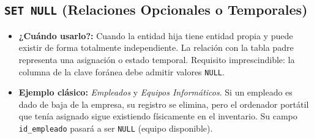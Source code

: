 \documentclass[12pt,a4paper]{article}
\begin{document}
\subsection{\texttt{SET NULL} (Relaciones Opcionales o Temporales)}
\begin{itemize}
    \item \textbf{¿Cuándo usarlo?:} Cuando la entidad hija tiene entidad propia y puede existir de forma totalmente independiente. La relación con la tabla padre representa una asignación o estado temporal. Requisito imprescindible: la columna de la clave foránea debe admitir valores \texttt{NULL}.
    \item \textbf{Ejemplo clásico:} \textit{Empleados} y \textit{Equipos Informáticos}. Si un empleado es dado de baja de la empresa, su registro se elimina, pero el ordenador portátil que tenía asignado sigue existiendo físicamente en el inventario. Su campo \texttt{id\_empleado} pasará a ser \texttt{NULL} (equipo disponible).
\end{itemize}
\end{document}
